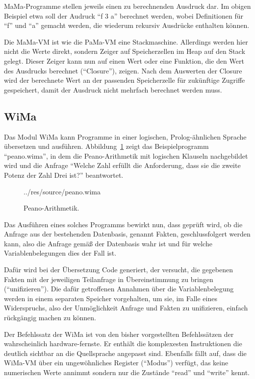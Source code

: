 \documentclass[german, a4paper, parskip, bibliography=totoc]{scrartcl}
\begin{document}
MaMa-Programme stellen jeweils einen zu berechnenden Ausdruck dar. Im obigen
Beispiel etwa soll der Audruck \enquote{f 3 a} berechnet werden, wobei
Definitionen für \enquote{f} und \enquote{a} gemacht werden, die wiederum
rekursiv Ausdrücke enthalten können.

Die MaMa-VM ist wie die PaMa-VM eine Stackmaschine. Allerdings werden hier
nicht die Werte direkt, sondern Zeiger auf Speicherzellen im Heap auf den Stack
gelegt. Dieser Zeiger kann nun auf einen Wert oder eine Funktion, die den Wert
des Ausdrucks berechnet (\enquote{Closure}), zeigen. Nach dem Auswerten der
Closure wird der berechnete Wert an der passenden Speicherzelle für
zukünftige Zugriffe gespeichert, damit der Ausdruck nicht mehrfach berechnet
werden muss.


\subsection{WiMa}
Das Modul WiMa kann Programme in einer logischen, Prolog-ähnlichen Sprache
übersetzen und ausführen. Abbildung~\ref{code_wima} zeigt das Beispielprogramm
\enquote{peano.wima}, in dem die Peano-Arithmetik mit logischen Klauseln
nachgebildet wird und die Anfrage \enquote{Welche Zahl erfüllt die Anforderung,
dass sie die zweite Potenz der Zahl Drei ist?} beantwortet.

\begin{figure}[htb]
    
        {../res/source/peano.wima}
    \caption{Peano-Arithmetik.}
    \label{code_wima}
\end{figure}

Das Ausführen eines solches Programms bewirkt nun, dass geprüft wird, ob die
Anfrage aus der bestehenden Datenbasis, genannt Fakten, geschlussfolgert werden
kann, also die Anfrage gemäß der Datenbasis wahr ist und für welche
Variablenbelegungen dies der Fall ist.

Dafür wird bei der Übersetzung Code generiert, der versucht, die gegebenen
Fakten mit der jeweiligen Teilanfrage in Übereinstimmung zu bringen
(\enquote{unifizieren}). Die dafür getroffenen Annahmen über die
Variablenbelegung werden in einem separaten Speicher vorgehalten, um sie, im
Falle eines Widerspruchs, also der Unmöglichkeit Anfrage und Fakten zu
unifizieren, einfach rückgängig machen zu können.

Der Befehlssatz der WiMa ist von den bisher vorgestellten Befehlssätzen der
wahrscheinlich hardware-fernste. Er enthält die komplexesten Instruktionen die
deutlich sichtbar an die Quellsprache angepasst sind. Ebenfalls fällt auf,
dass die WiMa-VM über ein ungewöhnliches Register (\enquote{Modus}) verfügt,
das keine numerischen Werte annimmt sondern nur die Zustände \enquote{read}
und \enquote{write} kennt.
\end{document}
